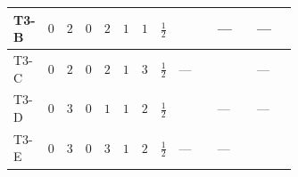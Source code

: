 \documentclass[8pt]{article}
\begin{document}
\begin{landscape}
\begin{longtable}{@{}llcccccc >{\raggedright\arraybackslash}p{0.21\linewidth} >{\raggedright\arraybackslash}p{0.21\linewidth} >{\raggedright\arraybackslash}p{0.21\linewidth}@{}}
\midrule
T3-B & $0$ & $2$ & $0$ & $2$ & $1$ & $1$ & $\frac{1}{2}$ & \scriptsize\adjustbox{max width=\linewidth}{$\begin{gathered} \frac{2 \sqrt{3} i lambdaT_{3} \overline{y_{1}} \overline{y_{2}}}{3 MF}\end{gathered}$} & --- & --- \\
\midrule
T3-C & $0$ & $2$ & $0$ & $2$ & $1$ & $3$ & $\frac{1}{2}$ & --- & \scriptsize\adjustbox{max width=\linewidth}{$\begin{gathered} - \frac{2 i lambdaT_{3} \overline{y_{1}} \overline{y_{2}}}{3 MF}\end{gathered}$} & --- \\
\midrule
T3-D & $0$ & $3$ & $0$ & $1$ & $1$ & $2$ & $\frac{1}{2}$ & \scriptsize\adjustbox{max width=\linewidth}{$\begin{gathered} \frac{2 \sqrt{3} i lambdaT_{3} \overline{y_{1}} \overline{y_{2}}}{3 MF}\end{gathered}$} & --- & --- \\
\midrule
T3-E & $0$ & $3$ & $0$ & $3$ & $1$ & $2$ & $\frac{1}{2}$ & --- & --- & \scriptsize\adjustbox{max width=\linewidth}{$\begin{gathered} - \frac{2 \sqrt{6} i lambdaT_{3} \overline{y_{1}} \overline{y_{2}}}{3 MF}\end{gathered}$} \\
\midrule
\bottomrule
\end{longtable}
\clearpage

\end{landscape}
\end{document}
